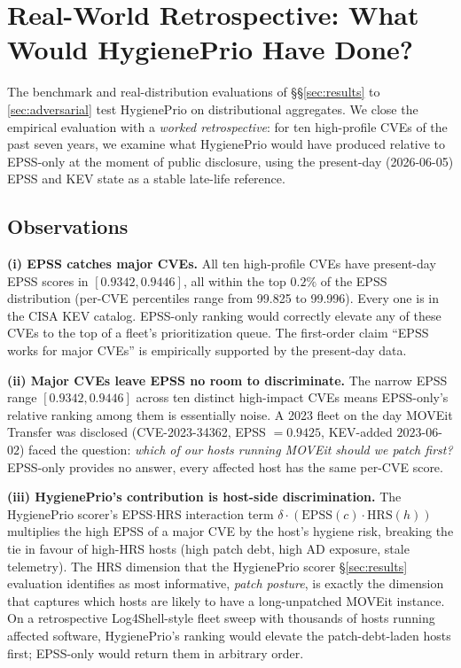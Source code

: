 \section{Real-World Retrospective: What Would HygienePrio Have Done?}
\label{sec:retrospective}

The benchmark and real-distribution evaluations of
\S\S\ref{sec:results} to \ref{sec:adversarial} test HygienePrio on
distributional aggregates. We close the empirical evaluation with a
\emph{worked retrospective}: for ten high-profile CVEs of the past
seven years, we examine what HygienePrio would have produced relative
to EPSS-only at the moment of public disclosure, using the
present-day (2026-06-05) EPSS and KEV state as a stable late-life
reference.



\subsection{Observations}

\textbf{(i) EPSS catches major CVEs.} All ten high-profile CVEs have
present-day EPSS scores in $[0.9342, 0.9446]$, all within the top
$0.2\%$ of the EPSS distribution (per-CVE percentiles range from
99.825 to 99.996). Every one is in the CISA KEV catalog.
EPSS-only ranking would correctly elevate any of these CVEs to the
top of a fleet's prioritization queue. The first-order claim
``EPSS works for major CVEs'' is empirically supported by the
present-day data.

\textbf{(ii) Major CVEs leave EPSS no room to discriminate.}
The narrow EPSS range $[0.9342, 0.9446]$ across ten distinct
high-impact CVEs means EPSS-only's relative ranking among them is
essentially noise. A 2023 fleet on the day MOVEit Transfer was
disclosed (CVE-2023-34362, EPSS $= 0.9425$, KEV-added $2023$-$06$-$02$)
faced the question: \emph{which of our hosts running MOVEit
should we patch first?} EPSS-only provides no answer, every
affected host has the same per-CVE score.

\textbf{(iii) HygienePrio's contribution is host-side discrimination.}
The HygienePrio scorer's EPSS$\cdot$HRS interaction term
$\delta \cdot (\mathrm{EPSS}(c) \cdot \mathrm{HRS}(h))$ multiplies
the high EPSS of a major CVE by the host's hygiene risk, breaking
the tie in favour of high-HRS hosts (high patch debt, high AD
exposure, stale telemetry). The HRS dimension that the HygienePrio scorer
\S\ref{sec:results} evaluation identifies as most informative,
\emph{patch posture}, is exactly the dimension that captures
which hosts are likely to have a long-unpatched MOVEit instance.
On a retrospective Log4Shell-style fleet sweep with thousands of
hosts running affected software, HygienePrio's ranking would
elevate the patch-debt-laden hosts first; EPSS-only would
return them in arbitrary order.

